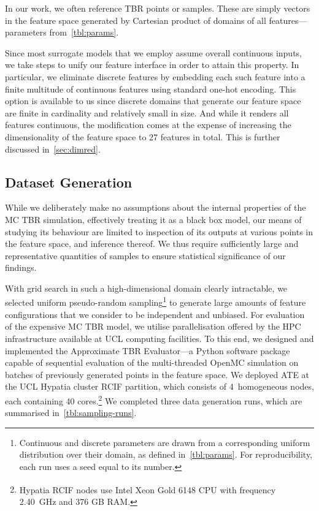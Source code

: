 In our work, we often reference TBR points or samples. These are simply vectors
in the feature space generated by Cartesian product of domains of all
features---parameters from~\cref{tbl:params}.

Since most surrogate models
that we employ assume overall continuous inputs, we take steps to unify our
feature interface in order to attain this property. In particular, we eliminate
discrete features by embedding each such feature into a finite multitude of
continuous features using standard one-hot encoding. This option is available to
us since discrete domains that generate our feature space are finite in
cardinality and relatively small in size. And while it renders all features continuous, the
modification comes at the expense of increasing the dimensionality of the
feature space to 27 features in total. This is further discussed
in~\cref{sec:dimred}.


\subsection{Dataset Generation}
\label{sec:dataset-generation}

While we deliberately make no assumptions about the internal properties of the
MC TBR simulation, effectively treating it as a black box model, our means of
studying its behaviour are limited to inspection of its outputs at various
points in the feature space, and inference thereof. We thus require
sufficiently large and representative quantities of samples to ensure
statistical significance of our findings.

With grid search in such a high-dimensional domain clearly intractable, we
selected uniform pseudo-random sampling\footnote{Continuous and discrete
parameters are drawn from a corresponding uniform distribution over their
domain, as defined in~\cref{tbl:params}. For reproducibility, each run uses a seed equal to its number.} to generate large amounts of feature
configurations that we consider to be independent and unbiased. For evaluation
of the expensive MC TBR model, we utilise parallelisation offered by
the HPC infrastructure available at UCL computing facilities. To this end, we
designed and implemented the Approximate TBR Evaluator---a Python software package capable of
sequential evaluation of the multi-threaded OpenMC simulation on batches of
previously generated points in the feature space.
We deployed ATE at the UCL Hypatia cluster RCIF partition, which consists of
4~homogeneous nodes, each containing 40 cores.\footnote{Hypatia RCIF nodes use
Intel\textsuperscript{\textregistered} Xeon\textsuperscript{\textregistered}
Gold 6148 CPU with frequency 2.40~GHz and 376 GB RAM.} We completed three data
generation runs, which are summarised in~\cref{tbl:sampling-runs}.

